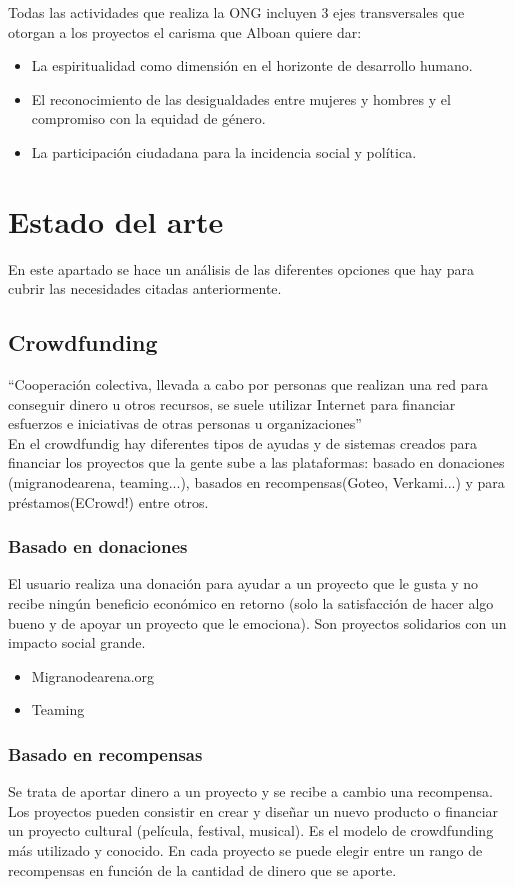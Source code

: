 Todas las actividades que realiza la ONG incluyen 3 ejes transversales que otorgan a los proyectos el carisma que Alboan quiere dar:
\begin{itemize}
	\item La espiritualidad como dimensión en el horizonte de desarrollo humano.
	\item El reconocimiento de las desigualdades entre mujeres y hombres y el compromiso con la equidad de género.
	\item La participación ciudadana para la incidencia social y política.
\end{itemize}

\section{Estado del arte}
En este apartado se hace un análisis de las diferentes opciones que hay para cubrir las necesidades citadas anteriormente.
\subsection{Crowdfunding}
“Cooperación colectiva, llevada a cabo por personas que realizan una red para conseguir dinero u otros recursos, se suele utilizar Internet para financiar esfuerzos e iniciativas de otras personas u organizaciones”\cite{crowdw}\\

En el crowdfundig hay diferentes tipos de ayudas y de sistemas creados para financiar los proyectos que la gente sube a las plataformas: basado en donaciones (migranodearena, teaming...), basados en recompensas(Goteo, Verkami...) y para préstamos(ECrowd!) entre otros.

\subsubsection{Basado en donaciones}
El usuario realiza una donación para ayudar a un proyecto que le gusta y no recibe ningún beneficio económico en retorno (solo la satisfacción de hacer algo bueno y de apoyar un proyecto que le emociona). Son proyectos solidarios con un impacto social grande.
\begin{itemize}
	\item Migranodearena.org
	\item Teaming
\end{itemize}

\subsubsection{Basado en recompensas}
Se trata de aportar dinero a un proyecto y se recibe a cambio una recompensa. Los proyectos pueden consistir en crear y diseñar un nuevo producto o financiar un proyecto cultural (película, festival, musical). Es el modelo de crowdfunding más utilizado y conocido. En cada proyecto se puede elegir entre un rango de recompensas en función de la cantidad de dinero que se aporte.
	
